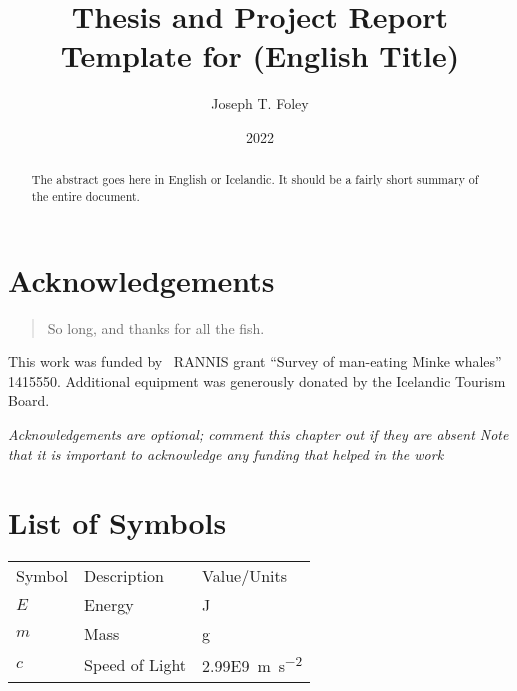 \documentclass[12pt,a4paper]{memoir}
\title{Thesis and Project Report Template for \theInstitution{} (English Title)}
\author{Joseph T. Foley}%
\date{2022}{2}{2}%
\begin{document}
\maketitle{}
\copyrightpage{}

\begin{abstract}
  The abstract goes here in English or Icelandic.
  It should be a fairly short summary of the entire document.
\end{abstract}


\enableindents{}%

\chapter*{Acknowledgements} 
\begin{quotation}
So long, and thanks for all the fish.
\end{quotation}
\vspace{\baselineskip}

This work was funded by \the\year~RANNIS grant ``Survey of man-eating Minke whales'' 1415550.
Additional equipment was generously donated by the Icelandic Tourism Board.

{\em Acknowledgements are optional; comment this chapter out if they are absent
  Note that it is important to acknowledge any funding that helped in the work\/}
\clearpage{}
\tableofcontents{}\clearpage
\listoffigures{}\clearpage
\listoftables{}\clearpage


\chapter*{List of Symbols}%
\begin{tabular}{lll}
Symbol &Description &Value/Units\\
$E$ &Energy &\si{\joule}\\ %
$m$ &Mass &\si{\gram}\\ %
$c$ &Speed of Light &\SI{2.99E9}{\meter\per\square\second}\\ %
\end{tabular}
\end{document}
